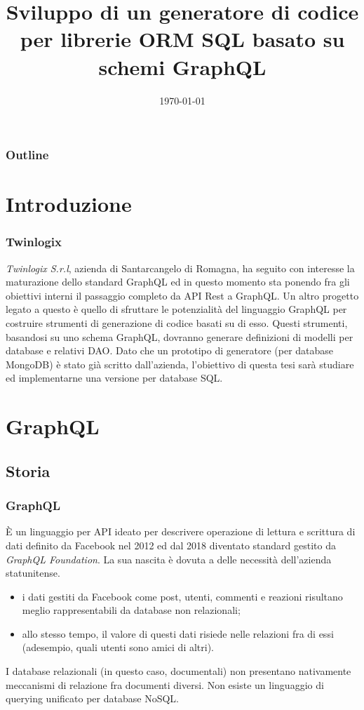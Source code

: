 \documentclass[c]{beamer}
\title[GraphQL e Model Driven Programming]{Sviluppo di un generatore di codice per librerie ORM SQL basato su schemi GraphQL}
\author[Ivan Perazzini]{\texorpdfstring{\usebox{\authbox}}{}}
\institute[Università di Bologna]{Ingegneria e Scienze Informatiche\\Alma Mater Studiorum—Università di Bologna, Cesena}
\date{\today}
\begin{document}
    \begin{frame}
        \titlepage
    \end{frame}

    \begin{frame}
        \frametitle{Outline}
        \tableofcontents
    \end{frame}
    \section{Introduzione}
        \begin{frame}
            \frametitle{Twinlogix}
            \emph{Twinlogix S.r.l}, azienda di Santarcangelo di Romagna, ha seguito con interesse la maturazione dello standard GraphQL ed
            in questo momento sta ponendo fra gli obiettivi interni il passaggio completo da API Rest a GraphQL.
            \vfill
            Un altro progetto legato a questo è quello di sfruttare le potenzialità del linguaggio GraphQL per costruire strumenti di generazione di codice basati su di esso.
            Questi strumenti, basandosi su uno schema GraphQL, dovranno generare definizioni di modelli per database e relativi DAO.
            \vfill
            Dato che un prototipo di generatore (per database MongoDB) è stato già scritto dall'azienda, l'obiettivo di questa tesi sarà studiare ed implementarne una versione per database SQL.
        \end{frame}
    \section{GraphQL}
        \subsection{Storia}
            \begin{frame}
                \frametitle{GraphQL}
                È un linguaggio per API ideato per descrivere operazione di lettura e scrittura di dati definito da Facebook nel 2012 ed dal 2018 diventato standard gestito da \emph{GraphQL Foundation}.
                La sua nascita è dovuta a delle necessità dell'azienda statunitense.
                \begin{itemize}
                    \item i dati gestiti da Facebook come post, utenti, commenti e reazioni risultano meglio rappresentabili da database non relazionali;
                    \item allo stesso tempo, il valore di questi dati risiede nelle relazioni fra di essi (adesempio, quali utenti sono amici di altri).
                \end{itemize}
                \vfill
                I database relazionali (in questo caso, documentali) non presentano nativamente meccanismi di relazione fra documenti diversi.
                Non esiste un linguaggio di querying unificato per database NoSQL.
            \end{frame}
\end{document}
